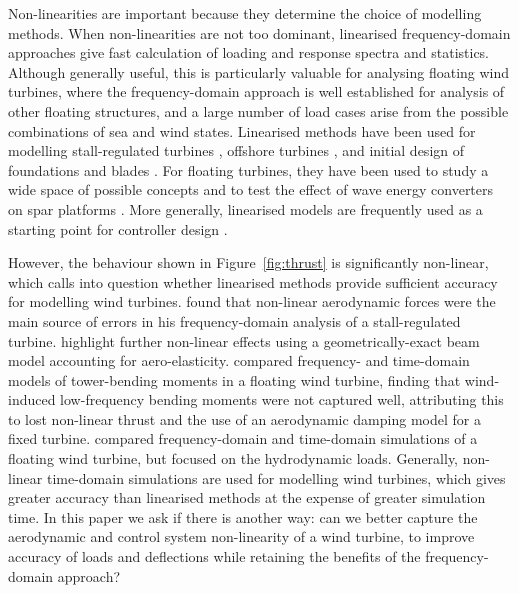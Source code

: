 \documentclass[preprint]{elsarticle}
\begin{document}
Non-linearities are important because they determine the choice of modelling
methods. When non-linearities are not too dominant, linearised frequency-domain
approaches give fast calculation of loading and response spectra and statistics.
Although generally useful, this is particularly valuable for analysing floating
wind turbines, where the frequency-domain approach is well established for
analysis of other floating structures, and a large number of load cases arise
from the possible combinations of sea and wind states. Linearised methods have
been used for modelling stall-regulated turbines
\citep{Halfpenny1998,merz_simple_2012}, offshore turbines
\citep{VanEngelen2004}, and initial design of foundations
\citep{vandermale_effect_2016} and blades \citep{dura_fast_2017}. For floating
turbines, they have been used to study a wide space of possible concepts
\citep{hall_evolving_2013} and to test the effect of wave energy converters on
spar platforms \citep{kluger_reducedorder_2016}. More generally, linearised
models are frequently used as a starting point for controller design
\citep{Burton2011}.

However, the behaviour shown in Figure~\ref{fig:thrust} is significantly
non-linear, which calls into question whether linearised methods provide
sufficient accuracy for modelling wind turbines. \citet{Halfpenny1998} found
that non-linear aerodynamic forces were the main source of errors in his
frequency-domain analysis of a stall-regulated turbine.
\citet{sabale_nonlinear_2019} highlight further non-linear effects using a
geometrically-exact beam model accounting for aero-elasticity.
\citet{kvittem_frequency_2014} compared frequency- and time-domain models of
tower-bending moments in a floating wind turbine, finding that wind-induced
low-frequency bending moments were not captured well, attributing this to lost
non-linear thrust and the use of an aerodynamic damping model for a fixed
turbine. \citet{philippe_comparison_2011} compared frequency-domain and
time-domain simulations of a floating wind turbine, but focused on the
hydrodynamic loads. Generally, non-linear time-domain simulations are used for
modelling wind turbines, which gives greater accuracy than linearised methods at
the expense of greater simulation time. In this paper we ask if there is another
way: can we better capture the aerodynamic and control system non-linearity of a
wind turbine, to improve accuracy of loads and deflections while retaining the
benefits of the frequency-domain approach?
\end{document}
